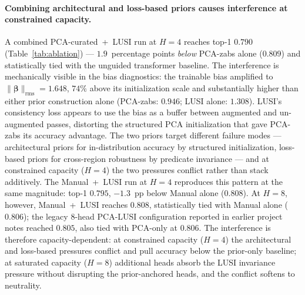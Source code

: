 \documentclass[11pt]{report}
\begin{document}
\paragraph{Combining architectural and loss-based priors causes interference at constrained capacity.}
A combined PCA-curated~+~LUSI run at $H = 4$ reaches top-1 $0.790$ (Table~\ref{tab:ablation}) --- $1.9$~percentage points \emph{below} PCA-zabs alone ($0.809$) and statistically tied with the unguided transformer baseline. The interference is mechanically visible in the bias diagnostics: the trainable bias amplified to $\|\bm{\beta}\|_{\text{rms}} = 1.648$, $74\%$ above its initialization scale and substantially higher than either prior construction alone (PCA-zabs: $0.946$; LUSI alone: $1.308$). LUSI's consistency loss appears to use the bias as a buffer between augmented and un-augmented passes, distorting the structured PCA initialization that gave PCA-zabs its accuracy advantage. The two priors target different failure modes --- architectural priors for in-distribution accuracy by structured initialization, loss-based priors for cross-region robustness by predicate invariance --- and at constrained capacity ($H = 4$) the two pressures conflict rather than stack additively. The Manual~+~LUSI run at $H = 4$ reproduces this pattern at the same magnitude: top-1 $0.795$, $-1.3$~pp below Manual alone ($0.808$). At $H = 8$, however, Manual~+~LUSI reaches $0.808$, statistically tied with Manual alone ($0.806$); the legacy 8-head PCA-LUSI configuration reported in earlier project notes reached $0.805$, also tied with PCA-only at $0.806$. The interference is therefore capacity-dependent: at constrained capacity ($H = 4$) the architectural and loss-based pressures conflict and pull accuracy below the prior-only baseline; at saturated capacity ($H = 8$) additional heads absorb the LUSI invariance pressure without disrupting the prior-anchored heads, and the conflict softens to neutrality.
\end{document}
